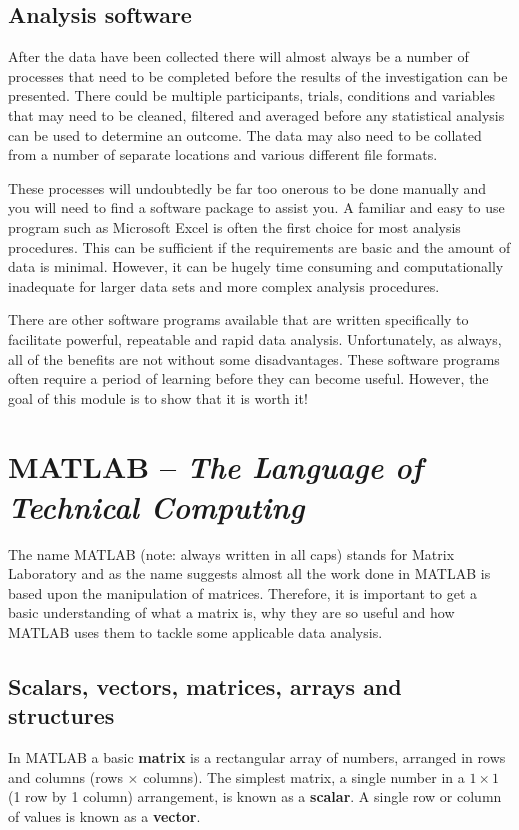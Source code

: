 \documentclass[12pt,a4paper]{article}
\begin{document}
\subsection{Analysis software}
After the data have been collected there will almost always be a number of processes that need to be completed before the results of the investigation can be presented.  
There could be multiple participants, trials, conditions and variables that may need to be cleaned, filtered and averaged before any statistical analysis can be used to determine an outcome.  
The data may also need to be collated from a number of separate locations and various different file formats.

These processes will undoubtedly be far too onerous to be done manually and you will need to find a software package to assist you.  
A familiar and easy to use program such as Microsoft Excel is often the first choice for most analysis procedures.  
This can be sufficient if the requirements are basic and the amount of data is minimal.  
However, it can be hugely time consuming and computationally inadequate for larger data sets and more complex analysis procedures.

There are other software programs available that are written specifically to facilitate powerful, repeatable and rapid data analysis.  
Unfortunately, as always, all of the benefits are not without some disadvantages.  
These software programs often require a period of learning before they can become useful.  
However, the goal of this module is to show that it is worth it!

\section{MATLAB -- \emph{The Language of Technical Computing}}
\label{sec:matrices}
The name MATLAB (note: always written in all caps) stands for Matrix Laboratory and as the name suggests almost all the work done in MATLAB is based upon the manipulation of matrices.  
Therefore, it is important to get a basic understanding of what a matrix is, why they are so useful and how MATLAB uses them to tackle some applicable data analysis.

\subsection{Scalars, vectors, matrices, arrays and structures}
In MATLAB a basic \textbf{matrix} is a rectangular array of numbers, arranged in rows and columns (rows $\times$ columns).  
The simplest matrix, a single number in a $1\times1$ (1 row by 1 column) arrangement, is known as a \textbf{scalar}.  
A single row or column of values is known as a \textbf{vector}.
\end{document}

